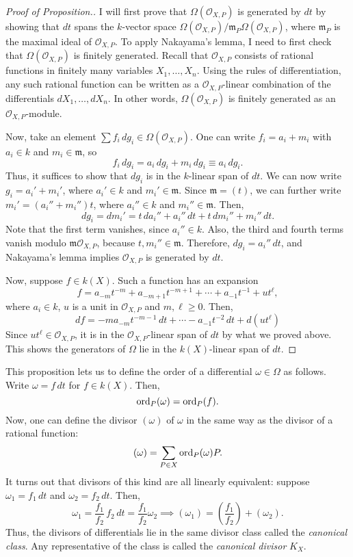 \begin{proof}[Proof of Proposition.]
  I will first prove that $\Omega\left(\mathscr{O}_{{X,P}}\right)$ is
  generated by $dt$ by showing that $dt$ spans the $k$-vector space
  $\Omega\left(\mathscr{O}_{X,P}\right)/\mathfrak{m}_{P}\Omega\left(
    \mathscr{O}_{X,P}\right)$, where $\mathfrak{m}_{P}$ is the maximal ideal
  of $\mathscr{O}_{X,P}$. To apply Nakayama's lemma, I need to first check that
  $\Omega\left(\mathscr{O}_{X,P}\right)$ is finitely generated.
  Recall that $\mathscr{O}_{X,P}$ consists of rational
  functions in finitely many variables $X_{1},\ldots,X_{n}$. Using the rules
  of differentiation, any such rational function can be written as a
  $\mathscr{O}_{X,P}$-linear combination of the differentials
  $dX_{1},\ldots,dX_{n}$. In other words, $\Omega(\mathscr{O}_{X,P})$ is
  finitely generated as an $\mathscr{O}_{X,P}$-module.

  Now, take an element $\sum f_{i}\,dg_{i}\in\Omega\left(\mathscr{O}_{X,P}\right)$.
  One can write $f_{i}=a_{i}+m_{i}$ with $a_{i}\in k$ and
  $m_{i}\in\mathfrak{m}$, so
  \[
    f_{i}\,dg_{i}=a_{i}\,dg_{i}+m_{i}\,dg_{i}\equiv a_{i}\,dg_{i}.
  \]
  Thus, it suffices to show that $dg_{i}$ is in the $k$-linear span of $dt$.
  We can now write $g_{i}=a_{i}'+m_{i}'$, where $a_{i}'\in k$ and
  $m_{i}'\in\mathfrak{m}$. Since $\mathfrak{m}=(t)$, we can further write
  $m_{i}'=(a_{i}''+m_{i}'')t$, where $a_{i}''\in k$ and $m_{i}''\in\mathfrak{m}$.
  Then,
  \[
    dg_{i}=dm_{i}'=t\,da_{i}''+a_{i}''\,dt+t\,dm_{i}''+m_{i}''\,dt.
  \]
  Note that the first term vanishes, since $a_{i}''\in k$. Also, the third
  and fourth terms vanish modulo $\mathfrak{m}\mathscr{O}_{X,P}$, because
  $t,m_{i}''\in\mathfrak{m}$. Therefore, $dg_{i}=a_{i}''\,dt$, and
  Nakayama's lemma implies $\mathscr{O}_{X,P}$ is generated by $dt$.

  Now, suppose $f\in k(X)$. Such a function has an expansion
  \[
    f=a_{-m}t^{-m}+a_{-m+1}t^{-m+1}+\cdots +a_{-1}t^{-1}+ut^{\ell},
  \]
  where $a_{i}\in k$, $u$ is a unit in $\mathscr{O}_{X,P}$ and $m,\ell\geq 0$.
  Then,
  \[
    df=-ma_{-m}t^{-m-1}\,dt+\cdots-a_{-1}t^{-2}\,dt+d\left(ut^{\ell}\right)
  \]
  Since $ut^{\ell}\in\mathscr{O}_{X,P}$, it is in the $\mathscr{O}_{X,P}$-linear
  span of $dt$ by what we proved above. This shows the generators of $\Omega$
  lie in the $k(X)$-linear span of $dt$.
\end{proof}
This proposition lets us to define the order of a differential
$\omega\in\Omega$ as follows. Write $\omega=f\,dt$ for $f\in k(X)$. Then,
\[
  \operatorname{ord}_{P}(\omega)=\operatorname{ord}_{P}(f).
\]
Now, one can define the divisor $(\omega)$ of $\omega$ in the same way as
the divisor of a rational function:
\[
  (\omega)=\sum_{P\in X}\operatorname{ord}_{P}(\omega)P.
\]
It turns out that divisors of this kind are all linearly equivalent: suppose
$\omega_{1}=f_{1}\,dt$ and $\omega_{2}=f_{2}\,dt$. Then,
\[
  \omega_{1}=\frac{f_{1}}{f_{2}}\, f_{2}\,dt=\frac{f_{1}}{f_{2}}\omega_{2}
  \implies (\omega_{1})=\left(\frac{f_{1}}{f_{2}}\right)+(\omega_{2}).
\]
Thus, the divisors of differentials lie in the same divisor class called the
\emph{canonical class}. Any representative of the class is called the
\emph{canonical divisor} $K_{X}$.

